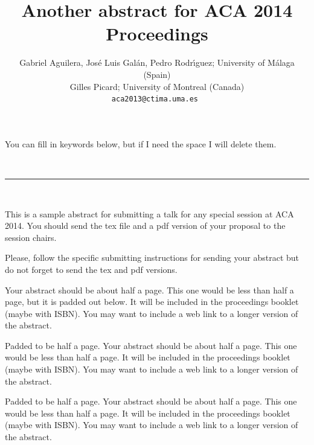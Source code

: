 \documentclass[titlepage=false]{article} %
\newcommand{\inlinemaketitle}{{\let\newpage\relax\maketitle}}
\def\keywords#1{\begin{center}{\bf Keywords}\\{#1}\end{center}} %
\def\authors#1{\author{#1}} %
\begin{document}
You can fill in keywords below, but if I need the space I will delete them.

\ \ 
\vspace*{3mm}
\hrule
\ \ 

\title{ Another abstract for ACA 2014 Proceedings \vspace*{-8mm}}

\authors{Gabriel Aguilera, Jos\'e Luis Gal\'an, Pedro Rodr\'{\i}guez;  %
       University of M\'alaga (Spain)  \vspace*{1mm} \\ %
       \vspace*{1mm} 
       Gilles Picard;   University of Montreal (Canada)  \\ %
       \tt{aca2013@ctima.uma.es} %
       }%

\inlinemaketitle

\vspace*{-5mm}

This is a sample abstract for submitting a talk  for any special session at ACA 2014. You
should send the tex file and a pdf version of your proposal to the session chairs.

Please, follow the specific submitting instructions for sending your abstract but do not forget to
send the tex and pdf versions.

Your abstract should be about half a page.  This one would be less than half a page, but it is padded out below. It will be  included in the proceedings
booklet (maybe with ISBN).  You may want to include a web link to a longer version of the abstract.

Padded to be half a page. Your abstract should be about half a page.  This one would be less than half a page. It will be  included in the proceedings
booklet (maybe with ISBN).  You may want to include a web link to a longer version of the abstract.

Padded to be half a page.  Your abstract should be about half a page.  This one would be less than half a page. It will be  included in the proceedings
booklet (maybe with ISBN).  You may want to include a web link to a longer version of the abstract.
\end{document}
